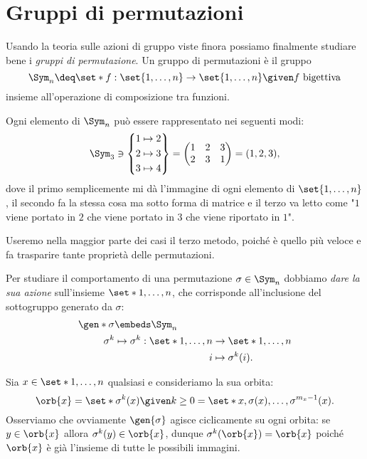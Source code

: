 \section{Gruppi di permutazioni}

Usando la teoria sulle azioni di gruppo viste finora possiamo finalmente studiare bene i \emph{gruppi di permutazione}. Un gruppo di permutazioni è il gruppo \[
    \Sym_n \deq \set*{f : \set{1, \dots, n} \to \set{1, \dots, n} \given f \text{ bigettiva}}
\] insieme all'operazione di composizione tra funzioni.

Ogni elemento di $\Sym_n$ può essere rappresentato nei seguenti modi: \[
    \Sym_3 \ni
    \left\{
    \begin{aligned}
        &1 \mapsto 2 \\
        &2 \mapsto 3 \\
        &3 \mapsto 4
    \end{aligned}
    \right\}
    = \begin{pmatrix}
        1 & 2 & 3\\
        2 & 3 & 1
    \end{pmatrix}
    = (1, 2, 3),
\] dove il primo semplicemente mi dà l'immagine di ogni elemento di $\set{1, \dots, n}$, il secondo fa la stessa cosa ma sotto forma di matrice e il terzo va letto come "$1$ viene portato in $2$ che viene portato in $3$ che viene riportato in $1$".

Useremo nella maggior parte dei casi il terzo metodo, poiché è quello più veloce e fa trasparire tante proprietà delle permutazioni.

Per studiare il comportamento di una permutazione $\sigma \in \Sym_n$ dobbiamo \emph{dare la sua azione} sull'insieme $\set*{1, \dots, n}$, che corrisponde all'inclusione del sottogruppo generato da $\sigma$: \begin{align*}
    \gen*{\sigma} &\embeds \Sym_n \\
    \sigma^k &\mapsto \begin{aligned}[t]
        \sigma^k : \set*{1, \dots, n} &\to \set*{1, \dots, n}\\
        i &\mapsto \sigma^k(i).
    \end{aligned}
\end{align*} 

Sia $x \in \set*{1, \dots, n}$ qualsiasi e consideriamo la sua orbita: \[
    \orb{x} = \set*{\sigma^k(x) \given k \geq 0} = \set*{x, \sigma(x), \dots, \sigma^{m_x - 1}(x)}.  
\] Osserviamo che ovviamente $\gen{\sigma}$ agisce ciclicamente su ogni orbita: se $y \in \orb{x}$ allora $\sigma^k(y) \in \orb{x}$, dunque $\sigma^k(\orb{x}) = \orb{x}$ poiché $\orb{x}$ è già l'insieme di tutte le possibili immagini.

